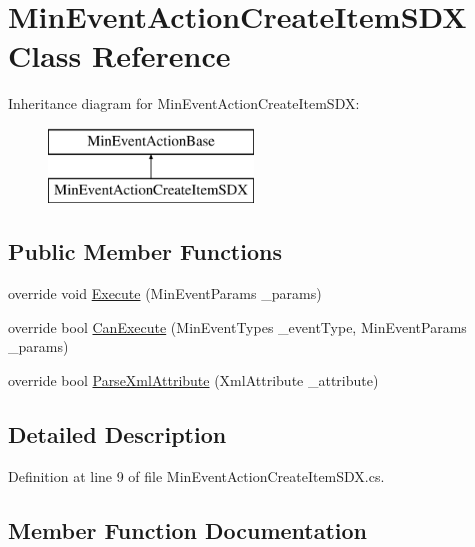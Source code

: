 \hypertarget{class_min_event_action_create_item_s_d_x}{}\section{Min\+Event\+Action\+Create\+Item\+S\+DX Class Reference}
\label{class_min_event_action_create_item_s_d_x}
Inheritance diagram for Min\+Event\+Action\+Create\+Item\+S\+DX\+:\begin{figure}[H]
\begin{center}
\leavevmode
\includegraphics[height=2.000000cm]{d9/d0f/class_min_event_action_create_item_s_d_x}
\end{center}
\end{figure}
\subsection*{Public Member Functions}
\begin{DoxyCompactItemize}
\item 
override void \mbox{\hyperlink{class_min_event_action_create_item_s_d_x_a988881e3f8cfc8d0ee0b596449f13c1f}{Execute}} (Min\+Event\+Params \+\_\+params)
\item 
override bool \mbox{\hyperlink{class_min_event_action_create_item_s_d_x_a7f9a7c8f3e39e91314f2e9dcc352089a}{Can\+Execute}} (Min\+Event\+Types \+\_\+event\+Type, Min\+Event\+Params \+\_\+params)
\item 
override bool \mbox{\hyperlink{class_min_event_action_create_item_s_d_x_af877e2c903654e429c2900b709c5af65}{Parse\+Xml\+Attribute}} (Xml\+Attribute \+\_\+attribute)
\end{DoxyCompactItemize}


\subsection{Detailed Description}


Definition at line 9 of file Min\+Event\+Action\+Create\+Item\+S\+D\+X.\+cs.



\subsection{Member Function Documentation}
\mbox{\label{class_min_event_action_create_item_s_d_x_a7f9a7c8f3e39e91314f2e9dcc352089a}} 
